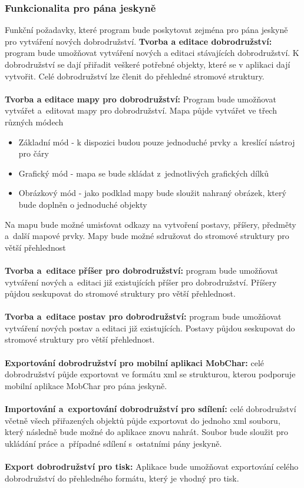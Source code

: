 \documentclass[thesis=B,czech]{resources/FITthesis}[2012/06/26]
\begin{document}
\subsubsection{Funkcionalita pro pána jeskyně}
Funkční požadavky, které program bude poskytovat zejména pro pána jeskyně pro vytváření nových dobrodružství.
\textbf{Tvorba a editace dobrodružství:} program bude umožňovat vytváření nových a editaci stávajících dobrodružství. K dobrodružství se dají přiřadit veškeré potřebné objekty, které se v aplikaci dají vytvořit. Celé dobrodružství lze členit do přehledné stromové struktury.\\
\\
\textbf{Tvorba a editace mapy pro dobrodružství:} Program bude umožňovat vytvářet a~editovat mapy pro dobrodružství. Mapa půjde vytvářet ve třech různých módech
\begin{itemize}
\item Základní mód - k dispozici budou pouze jednoduché prvky a~kreslící nástroj pro čáry
\item Grafický mód - mapa se bude skládat z~jednotlivých grafických dílků
\item Obrázkový mód - jako podklad mapy bude sloužit nahraný obrázek, který bude doplněn o jednoduché objekty
\end{itemize}
Na mapu bude možné umisťovat odkazy na vytvoření postavy, příšery, předměty a~další mapové prvky. Mapy bude možné sdružovat do stromové struktury pro větší přehlednost\\
\\
\textbf{Tvorba a~editace příšer pro dobrodružství:} program bude umožňovat vytváření nových a~editaci již existujících příšer pro dobrodružství. Příšery půjdou seskupovat do stromové struktury pro větší přehlednost.\\
\\
\textbf{Tvorba a~editace postav pro dobrodružství:} program bude umožňovat vytváření nových postav a editaci již existujících. Postavy půjdou seskupovat do stromové struktury pro větší přehlednost.\\
\\
\textbf{Exportování dobrodružství pro mobilní aplikaci MobChar:} celé dobrodružství půjde exportovat ve formátu xml se strukturou, kterou podporuje mobilní aplikace MobChar pro pána jeskyně.\\
\\
\textbf{Importování a~exportování dobrodružství pro sdílení:} celé dobrodružství včetně všech přiřazených objektů půjde exportovat do jednoho xml souboru, který následně bude možné do aplikace znovu nahrát. Soubor bude sloužit pro ukládání práce a~případné sdílení s~ostatními pány jeskyně.\\
\\
\textbf{Export dobrodružství pro tisk:} Aplikace bude umožňovat exportování celého dobrodružství do přehledného formátu, který je vhodný pro tisk. 
\end{document}
